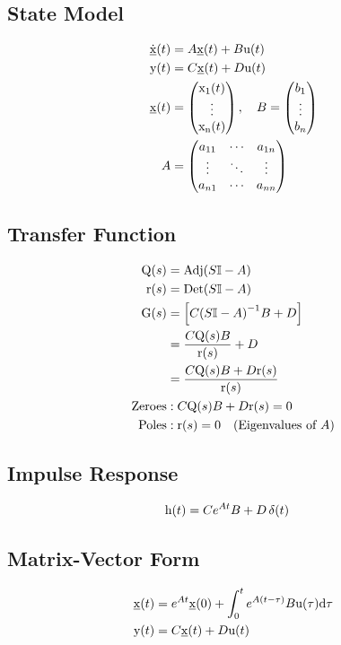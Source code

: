\documentclass[8pt]{extarticle}
\begin{document}
\begin{multicols*}{3}
\section*{State Model}
\begin{align*}
    \func{\dot{\underline{x}}}[t] &= A \func{\underline{x}}[t] + B \func{u}[t] \\
    \func{y}[t] &= C \func{\underline{x}}[t] + D \func{u}[t] \\
    \func{\underline{x}}[t] &= \crvector{\func{x_1}[t] \\ \vdots \\ \func{x_n}[t]},\quad B = \crvector{b_1 \\ \vdots \\ b_n} \\
    A &= \crvector{a_{11} & \cdots & a_{1n} \\ \vdots & \ddots & \vdots\\ a_{n1} & \cdots & a_{nn} }
\end{align*}

\subsection*{Transfer Function}
\begin{align*}
    \func{Q}[s] &= \func{Adj}[S \mathbb{I} - A] \\
    \func{r}[s] &= \func{Det}[S \mathbb{I} - A] \\
    \func{G}[s] &= \left[ C {(S \mathbb{I} - A)}^{-1} B + D \right] \\
                &= \frac{C \func{Q}[s] B}{\func{r}[s]} + D \\
                &= \frac{C \func{Q}[s] B + D \func{r}[s]}{\func{r}[s]} \\
    \text{Zeroes} &: C \func{Q}[s] B + D \func{r}[s] = 0 \\
    \text{Poles} &: \func{r}[s] = 0 \quad (\text{Eigenvalues of } A)
\end{align*}

\subsection*{Impulse Response}
\begin{align*}
    \func{h}[t] &= C e^{At} B + D\,\delta(t)
\end{align*}

\subsection*{Matrix-Vector Form}
\begin{align*}
    \func{\underline{x}}[t] &= e^{At}\func{\underline{x}}[0] + \intdef{0}{t}{e^{A(t-\tau)}B\func{u}[\tau]}{\tau} \\
    \func{y}[t] &= C\func{\underline{x}}[t] + D\func{u}[t]
\end{align*}


\end{multicols*}
\end{document}
